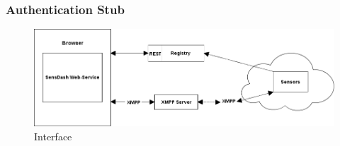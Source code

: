    \subsubsection{Authentication Stub}

\begin{figure}[!ht]
\centering
\includegraphics[scale=0.5]{images/Interface.png}   
\caption[Interface]{Interface}
\label{img:interfaces}                           
\end{figure}

